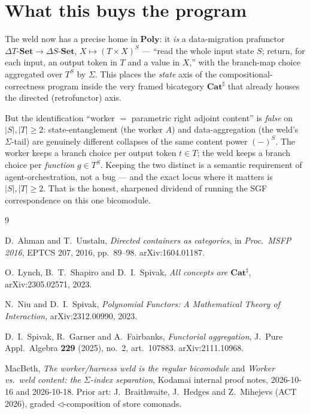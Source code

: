 \documentclass[11pt]{amsart}
\theoremstyle{plain}
\theoremstyle{definition}
\newcommand{\Poly}{\mathbf{Poly}}
\newcommand{\Cathash}{\mathbf{Cat}^{\sharp}}
\newcommand{\Set}{\mathbf{Set}}
\renewcommand{\lhd}{\triangleleft}
\newcommand{\Store}[1]{\Delta #1}
\begin{document}
\section{What this buys the program}\label{sec:conc}

The weld now has a precise home in $\Poly$: it \emph{is} a data-migration prafunctor
$\Store{T}\text{-}\Set\to\Store{S}\text{-}\Set$, $X\mapsto(T\times X)^{S}$ --- ``read the
whole input state $S$; return, for each input, an output token in $T$ and a value in $X$,''
with the branch-map choice aggregated over $T^{S}$ by $\Sigma$. This places the \emph{state}
axis of the compositional-correctness program inside the very framed bicategory $\Cathash$
that already houses the directed (retrofunctor) axis.

But the identification ``worker $=$ parametric right adjoint content'' is \emph{false} on
$|S|,|T|\ge 2$: state-entanglement (the worker $A$) and data-aggregation (the weld's
$\Sigma$-tail) are genuinely different collapses of the same content power $(-)^{S}$. The
worker keeps a branch choice per output token $t\in T$; the weld keeps a branch choice per
\emph{function} $g\in T^{S}$. Keeping the two distinct is a semantic requirement of
agent-orchestration, not a bug --- and the exact locus where it matters is $|S|,|T|\ge 2$.
That is the honest, sharpened dividend of running the SGF correspondence on this one
bicomodule.

\begin{thebibliography}{9}

D.~Ahman and T.~Uustalu,
\emph{Directed containers as categories},
in \emph{Proc.\ MSFP 2016}, EPTCS 207, 2016, pp.~89--98.
arXiv:1604.01187.

O.~Lynch, B.~T.~Shapiro and D.~I.~Spivak,
\emph{All concepts are $\mathbf{Cat}^{\sharp}$},
arXiv:2305.02571, 2023.

N.~Niu and D.~I.~Spivak,
\emph{Polynomial Functors: A Mathematical Theory of Interaction},
arXiv:2312.00990, 2023.

D.~I.~Spivak, R.~Garner and A.~Fairbanks,
\emph{Functorial aggregation},
J.\ Pure Appl.\ Algebra \textbf{229} (2025), no.~2, art.~107883.
arXiv:2111.10968.

MacBeth,
\emph{The worker/harness weld is the regular bicomodule} and
\emph{Worker vs.\ weld content: the $\Sigma$-index separation},
Kodamai internal proof notes, 2026-10-16 and 2026-10-18.
Prior art: J.~Braithwaite, J.~Hedges and Z.~Mihejevs (ACT 2026), graded
$\lhd$-composition of store comonads.

\end{thebibliography}
\end{document}
